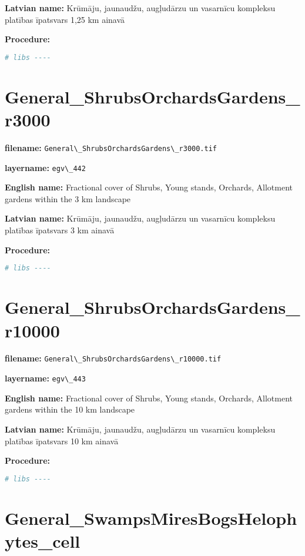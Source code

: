 \documentclass[
]{book}
\newcommand{\passthrough}[1]{#1}
\begin{document}
\textbf{Latvian name:} Krūmāju, jaunaudžu, augļudārzu un vasarnīcu kompleksu platības īpatsvars 1,25 km ainavā

\textbf{Procedure:}

\begin{lstlisting}[language=R]
# libs ----
\end{lstlisting}

\section{General\_ShrubsOrchardsGardens\_r3000}\label{ch06.442}

\textbf{filename:} \passthrough{\lstinline!General\_ShrubsOrchardsGardens\_r3000.tif!}

\textbf{layername:} \passthrough{\lstinline!egv\_442!}

\textbf{English name:} Fractional cover of Shrubs, Young stands, Orchards, Allotment gardens within the 3 km landscape

\textbf{Latvian name:} Krūmāju, jaunaudžu, augļudārzu un vasarnīcu kompleksu platības īpatsvars 3 km ainavā

\textbf{Procedure:}

\begin{lstlisting}[language=R]
# libs ----
\end{lstlisting}

\section{General\_ShrubsOrchardsGardens\_r10000}\label{ch06.443}

\textbf{filename:} \passthrough{\lstinline!General\_ShrubsOrchardsGardens\_r10000.tif!}

\textbf{layername:} \passthrough{\lstinline!egv\_443!}

\textbf{English name:} Fractional cover of Shrubs, Young stands, Orchards, Allotment gardens within the 10 km landscape

\textbf{Latvian name:} Krūmāju, jaunaudžu, augļudārzu un vasarnīcu kompleksu platības īpatsvars 10 km ainavā

\textbf{Procedure:}

\begin{lstlisting}[language=R]
# libs ----
\end{lstlisting}

\section{General\_SwampsMiresBogsHelophytes\_cell}\label{ch06.444}
\end{document}
